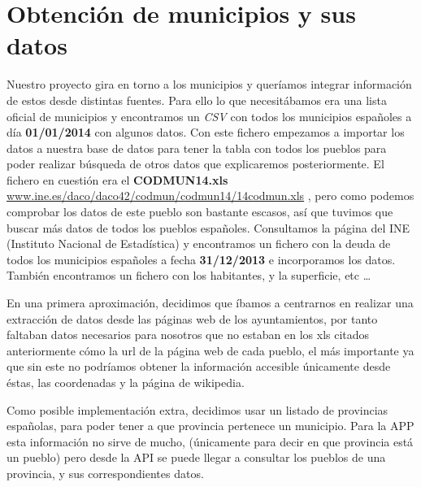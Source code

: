 %
%
%
%
%

\chapter{Obtención de municipios y sus datos}
\label{chap:obdat}
Nuestro proyecto gira en torno a los municipios y queríamos integrar información de estos desde distintas fuentes. Para ello lo que necesitábamos era una lista oficial de municipios y encontramos un \textit{CSV} con todos los municipios españoles a día \textbf{01/01/2014} con algunos datos. Con este fichero empezamos a importar los datos a nuestra base de datos para tener la tabla con todos los pueblos para poder realizar búsqueda de otros datos que explicaremos posteriormente. El fichero en cuestión era el \textbf{CODMUN14.xls} \href{www.ine.es/daco/daco42/codmun/codmun14/14codmun.xls}{www.ine.es/daco/daco42/codmun/codmun14/14codmun.xls} 
, pero como podemos comprobar los datos de este pueblo son bastante escasos, así que tuvimos que buscar más datos de todos los pueblos españoles. Consultamos la página del INE (Instituto Nacional de Estadística) y encontramos un fichero con la deuda de todos los municipios españoles a fecha \textbf{31/12/2013} e incorporamos los datos. También encontramos un fichero con los habitantes, y la superficie, etc \ldots 

En una primera aproximación, decidimos que íbamos a centrarnos en realizar una extracción de datos desde las páginas web de los ayuntamientos, por tanto faltaban datos necesarios para nosotros que no estaban en los xls citados anteriormente cómo la url de la página web de cada pueblo, el más importante ya que sin este no podríamos obtener la información accesible únicamente desde éstas, las coordenadas y la página de wikipedia.

Como posible implementación extra, decidimos usar un listado de provincias españolas, para poder tener a que provincia pertenece un municipio. Para la APP esta información no sirve de mucho, (únicamente para decir en que provincia está un pueblo) pero desde la API se puede llegar a consultar los pueblos de una provincia, y sus correspondientes datos.

